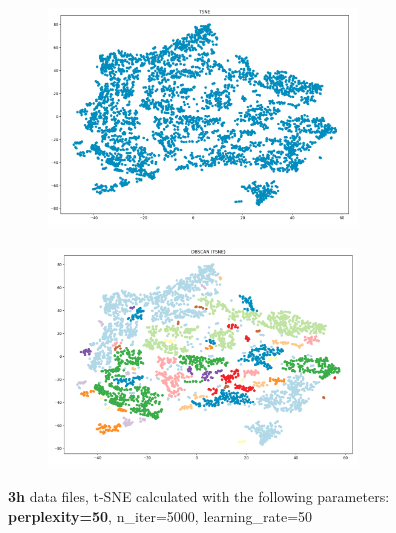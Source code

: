 \begin{figure}[H]
  \centering
	\begin{subfigure}{.5\textwidth}
    \centering
    \includegraphics[width=0.9\textwidth]{./images/tsneParametersTest/perplexity/perp50-3hTSNE.png}
  \end{subfigure}%
  \begin{subfigure}{.5\textwidth}
    \centering
    \includegraphics[width=0.9\textwidth]{./images/tsneParametersTest/perplexity/perp50-3hDBSCAN.png}
	\end{subfigure}
	\caption{\textbf{3h} data files, t-SNE calculated with the following parameters: \textbf{perplexity=50}, n\_iter=5000, learning\_rate=50}
  \label{figure:3hperp50TSNE}
\end{figure}
